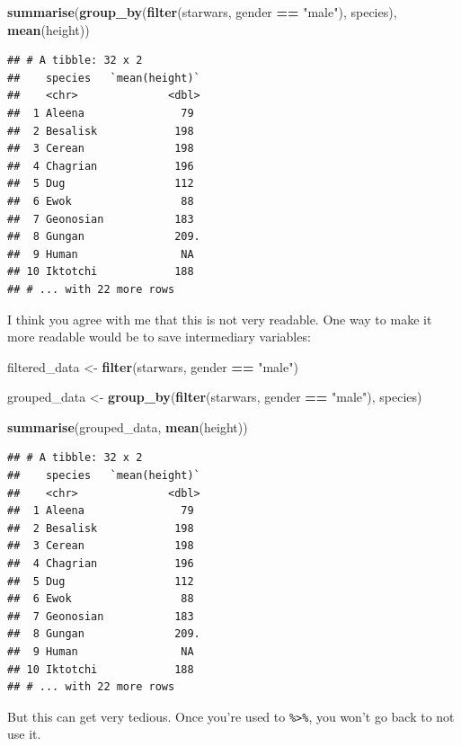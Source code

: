 \documentclass[]{gitbook}
\newenvironment{Shaded}{\begin{snugshade}}{\end{snugshade}}
\newcommand{\KeywordTok}[1]{\textcolor[rgb]{0.13,0.29,0.53}{\textbf{#1}}}
\newcommand{\NormalTok}[1]{#1}
\newcommand{\OperatorTok}[1]{\textcolor[rgb]{0.81,0.36,0.00}{\textbf{#1}}}
\newcommand{\StringTok}[1]{\textcolor[rgb]{0.31,0.60,0.02}{#1}}
\theoremstyle{definition}
\theoremstyle{definition}
\theoremstyle{definition}
\theoremstyle{remark}
\begin{document}
\begin{Shaded}
\begin{Highlighting}[]
\KeywordTok{summarise}\NormalTok{(}\KeywordTok{group_by}\NormalTok{(}\KeywordTok{filter}\NormalTok{(starwars, gender }\OperatorTok{==}\StringTok{ "male"}\NormalTok{), species), }\KeywordTok{mean}\NormalTok{(height))}
\end{Highlighting}
\end{Shaded}

\begin{verbatim}
## # A tibble: 32 x 2
##    species   `mean(height)`
##    <chr>              <dbl>
##  1 Aleena               79 
##  2 Besalisk            198 
##  3 Cerean              198 
##  4 Chagrian            196 
##  5 Dug                 112 
##  6 Ewok                 88 
##  7 Geonosian           183 
##  8 Gungan              209.
##  9 Human                NA 
## 10 Iktotchi            188 
## # ... with 22 more rows
\end{verbatim}

I think you agree with me that this is not very readable. One way to
make it more readable would be to save intermediary variables:

\begin{Shaded}
\begin{Highlighting}[]
\NormalTok{filtered_data <-}\StringTok{ }\KeywordTok{filter}\NormalTok{(starwars, gender }\OperatorTok{==}\StringTok{ "male"}\NormalTok{)}

\NormalTok{grouped_data <-}\StringTok{ }\KeywordTok{group_by}\NormalTok{(}\KeywordTok{filter}\NormalTok{(starwars, gender }\OperatorTok{==}\StringTok{ "male"}\NormalTok{), species)}

\KeywordTok{summarise}\NormalTok{(grouped_data, }\KeywordTok{mean}\NormalTok{(height))}
\end{Highlighting}
\end{Shaded}

\begin{verbatim}
## # A tibble: 32 x 2
##    species   `mean(height)`
##    <chr>              <dbl>
##  1 Aleena               79 
##  2 Besalisk            198 
##  3 Cerean              198 
##  4 Chagrian            196 
##  5 Dug                 112 
##  6 Ewok                 88 
##  7 Geonosian           183 
##  8 Gungan              209.
##  9 Human                NA 
## 10 Iktotchi            188 
## # ... with 22 more rows
\end{verbatim}

But this can get very tedious. Once you're used to
\texttt{\%\textgreater{}\%}, you won't go back to not use it.
\end{document}
